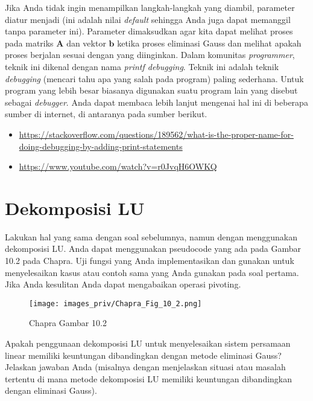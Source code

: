 Jika Anda tidak ingin menampilkan langkah-langkah yang diambil, parameter
 diatur menjadi  (ini adalah nilai \textit{default}
sehingga Anda juga dapat memanggil  tanpa parameter ini).
Parameter  dimaksudkan agar kita dapat melihat
proses pada matriks $\mathbf{A}$ dan vektor $\mathbf{b}$ ketika
proses eliminasi Gauss dan melihat apakah proses berjalan
sesuai dengan yang diinginkan.
Dalam komunitas \textit{programmer}, teknik ini dikenal
dengan nama \textit{printf debugging}. Teknik ini adalah
teknik \textit{debugging} (mencari tahu apa yang salah pada program)
paling sederhana. Untuk program yang lebih besar biasanya digunakan
suatu program lain yang disebut sebagai \textit{debugger}.
Anda dapat membaca lebih lanjut mengenai
hal ini di beberapa sumber di internet, di antaranya pada sumber
berikut.
\begin{itemize}
\item {\footnotesize\url{https://stackoverflow.com/questions/189562/what-is-the-proper-name-for-doing-debugging-by-adding-print-statements}}
\item {\footnotesize\url{https://www.youtube.com/watch?v=r0JvqH6OWKQ}}
\end{itemize}



\section{Dekomposisi LU}

\begin{soal}
Lakukan hal yang sama dengan soal sebelumnya, namun dengan menggunakan
dekomposisi LU.
Anda dapat menggunakan pseudocode yang ada pada Gambar 10.2 pada Chapra.
Uji fungsi yang Anda implementasikan dan gunakan untuk menyelesaikan
kasus atau contoh sama yang Anda gunakan pada soal pertama. Jika Anda kesulitan
Anda dapat mengabaikan operasi pivoting.
\end{soal}

\begin{figure}
{\centering
\texttt{[image: images\_priv/Chapra\_Fig\_10\_2.png]}
\par}
\caption{Chapra Gambar 10.2}
\end{figure}


\begin{soal}
Apakah penggunaan dekomposisi LU untuk menyelesaikan sistem persamaan linear memiliki keuntungan
dibandingkan dengan metode eliminasi Gauss? Jelaskan jawaban Anda (misalnya dengan menjelaskan
situasi atau masalah tertentu di mana metode dekomposisi LU memiliki keuntungan dibandingkan
dengan eliminasi Gauss).
\end{soal}

